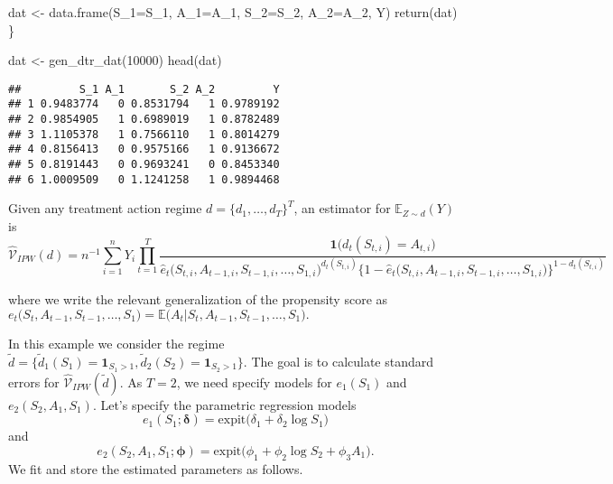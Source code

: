 \documentclass[
]{article}
\newenvironment{Shaded}{\begin{snugshade}}{\end{snugshade}}
\newcommand{\AttributeTok}[1]{\textcolor[rgb]{0.77,0.63,0.00}{#1}}
\newcommand{\DecValTok}[1]{\textcolor[rgb]{0.00,0.00,0.81}{#1}}
\newcommand{\FunctionTok}[1]{\textcolor[rgb]{0.00,0.00,0.00}{#1}}
\newcommand{\NormalTok}[1]{#1}
\newcommand{\OtherTok}[1]{\textcolor[rgb]{0.56,0.35,0.01}{#1}}
\begin{document}
\begin{Shaded}
\begin{Highlighting}[]
\NormalTok{dat }\OtherTok{\textless{}{-}} \FunctionTok{data.frame}\NormalTok{(}\AttributeTok{S\_1=}\NormalTok{S\_1, }\AttributeTok{A\_1=}\NormalTok{A\_1, }\AttributeTok{S\_2=}\NormalTok{S\_2, }\AttributeTok{A\_2=}\NormalTok{A\_2, Y)  }
\FunctionTok{return}\NormalTok{(dat)}
\NormalTok{\}}
\end{Highlighting}
\end{Shaded}

\begin{Shaded}
\begin{Highlighting}[]
\NormalTok{dat }\OtherTok{\textless{}{-}} \FunctionTok{gen\_dtr\_dat}\NormalTok{(}\DecValTok{10000}\NormalTok{)}
\FunctionTok{head}\NormalTok{(dat)}
\end{Highlighting}
\end{Shaded}

\begin{verbatim}
##         S_1 A_1       S_2 A_2         Y
## 1 0.9483774   0 0.8531794   1 0.9789192
## 2 0.9854905   1 0.6989019   1 0.8782489
## 3 1.1105378   1 0.7566110   1 0.8014279
## 4 0.8156413   0 0.9575166   1 0.9136672
## 5 0.8191443   0 0.9693241   0 0.8453340
## 6 1.0009509   0 1.1241258   1 0.9894468
\end{verbatim}

Given any treatment action regime \(d=\{d_1,\ldots, d_T\}^T\), an
estimator for \(\mathbb{E}_{Z\sim d}(Y)\) is \begin{equation}
\label{eq:1}
\hat{\mathcal{V}}_{IPW}(d)=n^{-1}\sum_{i=1}^nY_i\prod_{t=1}^T\frac{\mathbf{1}\big({d_t(S_{t,i})=A_{t,i}}\big)}{\hat{e}_t\Big(S_{t,i},A_{t-1,i},S_{t-1,i}, \ldots,S_{1,i}\Big)^{d_t(S_{t,i})}\bigg\{1-\hat{e}_t\Big(S_{t,i},A_{t-1,i},S_{t-1,i}, \ldots,S_{1,i}\Big)\bigg\}^{1-d_t(S_{t,i})} }
\end{equation}

where we write the relevant generalization of the propensity score as
\(e_t\Big(S_{t},A_{t-1},S_{t-1}, \ldots,S_{1}\Big)=\mathbb{E}\Big(A_{t}|S_{t},A_{t-1},S_{t-1}, \ldots,S_{1}\Big).\)

In this example we consider the regime
\(\tilde{d}=\{\tilde{d}_1(S_1)=\mathbf{1}_{S_1>1},\tilde{d}_2(S_2)=\mathbf{1}_{S_2>1}\}\).
The goal is to calculate standard errors for
\(\hat{\mathcal{V}}_{IPW}(\tilde{d})\). As \(T=2\), we need specify
models for \(e_1(S_1)\) and \(e_2(S_2,A_1,S_1)\). Let's specify the
parametric regression models
\[e_1(S_1;\boldsymbol{\delta})=\text{expit}\big(\delta_1+\delta_2\log S_1)\]
and
\[e_2(S_2,A_1,S_1;\boldsymbol{\phi})=\text{expit}\big(\phi_1+\phi_2\log S_2 +\phi_3A_1).\]
We fit and store the estimated parameters as follows.
\end{document}
